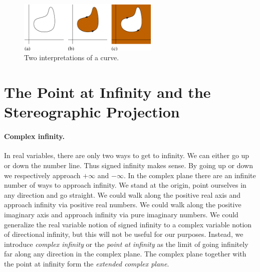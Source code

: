 \begin{figure}[htb!]
  \begin{center}
      \includegraphics[width=0.6\textwidth]{fcv/function/two_views}
  \end{center}
  \caption{Two interpretations of a curve.}
  \label{two_views}
\end{figure}










\section{The Point at Infinity and the Stereographic Projection}



\paragraph{Complex infinity.}
In real variables, there are only two ways to get to infinity.  
We can either go up or down the number line.  Thus signed infinity makes 
sense.  By going up or down we respectively approach $+ \infty$ and $- \infty$.
In the complex plane there are an infinite number of ways to approach 
infinity.  We stand at the origin, point ourselves in any direction and 
go straight.  We could walk along the positive real axis and approach
infinity via positive real numbers.  We could walk along the positive 
imaginary axis and approach infinity via pure imaginary numbers.  We could
generalize the real variable notion of signed infinity to a complex variable
notion of directional infinity, but this will not be useful for our 
purposes.  Instead, we introduce \textit{complex infinity} or
the \textit{point at infinity} as the limit of going infinitely far
along any direction in the complex plane.  The complex plane together with
the point at infinity form the \textit{extended complex plane}.




